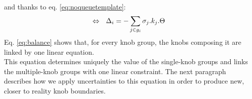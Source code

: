 \\ 
and thanks to eq. \ref{eq:noqueuetemplate}:
\begin{equation}
\centering
\label{eq:balance}
\Leftrightarrow\ \ \Delta_{i}=-\sum\limits_{j\in g_{i}}\sigma_{j}.k_{j}.\Theta
\end{equation}
Eq. \ref{eq:balance} shows that, for every knob group, the knobs composing it are linked by one linear equation.\\
This equation determines uniquely the value of the single-knob groups and links the multiple-knob groups with one linear constraint. The next paragraph describes how we apply uncertainties to this equation in order to produce new, closer to reality knob boundaries.\\

